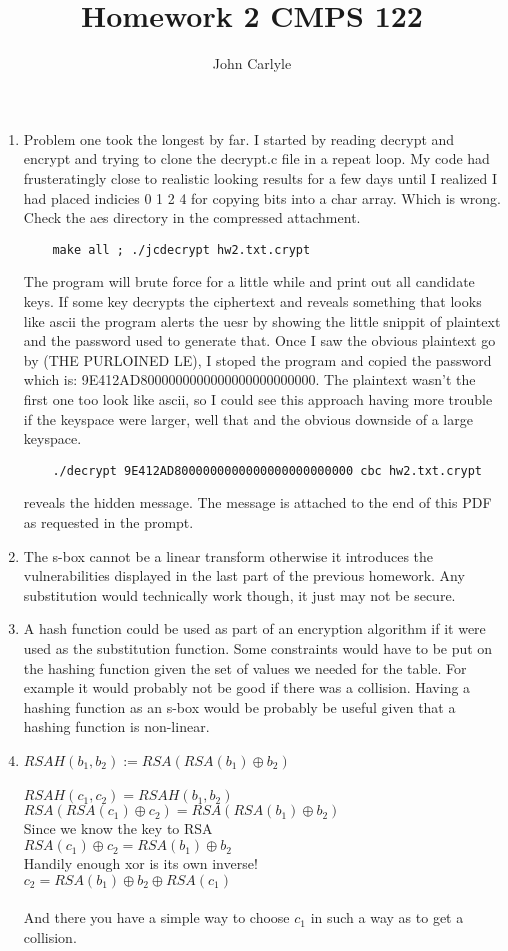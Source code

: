 \documentclass{article}
\title{Homework 2 CMPS 122}
\author{John Carlyle}
\begin{document}
\maketitle


\begin{enumerate}

\item
  Problem one took the longest by far. I started by reading decrypt and encrypt and trying to clone the decrypt.c file in a repeat loop. My code had frusteratingly close to realistic looking results for a few days until I realized I had placed indicies 0 1 2 4 for copying bits into a char array. Which is wrong. Check the aes directory in the compressed attachment. 
  \begin{verbatim}
    make all ; ./jcdecrypt hw2.txt.crypt
  \end{verbatim}
  The program will brute force for a little while and print out all candidate keys. If some key decrypts the ciphertext and reveals something that looks like ascii the program alerts the uesr by showing the little snippit of plaintext and the password used to generate that. Once I saw the obvious plaintext go by (THE PURLOINED LE), I stoped the program and copied the password which is: 9E412AD8000000000000000000000000. The plaintext wasn't the first one too look like ascii, so I could see this approach having more trouble if the keyspace were larger, well that and the obvious downside of a large keyspace. 
  \begin{verbatim}
    ./decrypt 9E412AD8000000000000000000000000 cbc hw2.txt.crypt
  \end{verbatim}
  reveals the hidden message. The message is attached to the end of this PDF as requested in the prompt.
\item
  The s-box cannot be a linear transform otherwise it introduces the vulnerabilities displayed in the last part of the previous homework. Any substitution would technically work though, it just may not be secure.
\item
  A hash function could be used as part of an encryption algorithm if it were used as the substitution function. Some constraints would have to be put on the hashing function given the set of values we needed for the table. For example it would probably not be good if there was a collision. Having a hashing function as an s-box would be probably be useful given that a hashing function is non-linear.
\item
  $RSAH(b_1,b_2) := RSA(RSA(b_1) \oplus b_2)$\\\\
  $RSAH(c_1,c_2) = RSAH(b_1,b_2)$\\
  $RSA(RSA(c_1) \oplus c_2) = RSA(RSA(b_1) \oplus b_2)$\\
  Since we know the key to RSA\\
  $RSA(c_1) \oplus c_2 = RSA(b_1) \oplus b_2$\\
  Handily enough xor is its own inverse!\\
  $c_2 = RSA(b_1) \oplus b_2 \oplus RSA(c_1)$\\\\
  And there you have a simple way to choose $c_1$ in such a way as to get a collision.


\end{enumerate}
\end{document}
